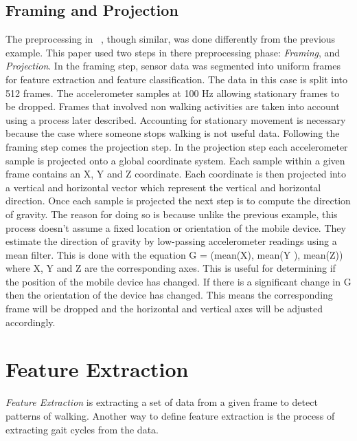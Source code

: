 \documentclass{sig-alternate}
\begin{document}
\subsection{Framing and Projection}
	The preprocessing in ~\cite{Lu:2014}, though similar, was done differently from the previous example. This paper used two steps in there preprocessing phase: \textit{Framing}, and \textit{Projection}. In the framing step, sensor data was segmented into uniform frames for feature extraction and feature classification. The data in this case is split into 512 frames. The accelerometer samples at 100 Hz allowing stationary frames to be dropped. Frames that involved non walking activities are taken into account using a process later described. Accounting for stationary movement is necessary because the case where someone stops walking is not useful data. Following the framing step comes the projection step. In the projection step each accelerometer sample is projected onto a global coordinate system. Each sample within a given frame contains an X, Y and Z coordinate. Each coordinate is then projected into a vertical and horizontal vector which represent the vertical and horizontal direction. Once each sample is projected the next step is to compute the direction of gravity. The reason for doing so is because unlike the previous example, this process doesn't assume a fixed location or orientation of the mobile device. They estimate the direction of gravity by low-passing accelerometer readings using a mean filter. This is done with the equation G = (mean(X), mean(Y ), mean(Z)) where X, Y and Z are the corresponding axes. This is useful for determining if the position of the mobile device has changed. If there is a significant change in G then the orientation of the device has changed. This means the corresponding frame will be dropped and the horizontal and vertical axes will be adjusted accordingly. 


\section{Feature Extraction}
	\textit{Feature Extraction} is extracting a set of data from a given frame to detect patterns of walking. Another way to define feature extraction is the process of extracting gait cycles from the data.
\end{document}
